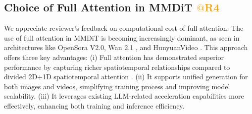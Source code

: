 \begin{table}[htbp]
    \centering
    \footnotesize
        \centering
        \caption{Ablation study results on Probabilistic Dynamic Masking in Instance-Masked Loss.}
        \label{tab:alpha}
\end{table}






\subsection{Choice of Full Attention in MMDiT  \textcolor{orange}{$@$R4}}

We appreciate reviewer’s feedback on computational cost of full attention. 
The use of full attention in MMDiT is becoming increasingly dominant, as seen in architectures like OpenSora V2.0, Wan 2.1 \cite{wan2025wanopenadvancedlargescale}, and HunyuanVideo \cite{kong2025hunyuanvideosystematicframeworklarge}. This approach offers three key advantages:
(i) Full attention has demonstrated superior performance by capturing richer spatiotemporal relationships compared to divided 2D+1D spatiotemporal attention \cite{ polyak2025moviegencastmedia,yang2025cogvideoxtexttovideodiffusionmodels,brooks2024videoworldsimulators,genmo2024mochi}. 
(ii) It supports unified generation for both images and videos, simplifying training process and improving model scalability. 
(iii) It leverages existing LLM-related acceleration capabilities more effectively, enhancing both training and inference efficiency. 



